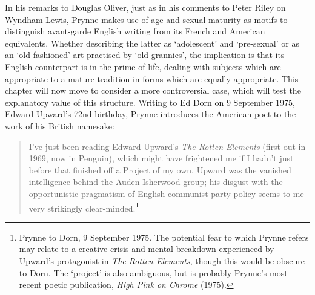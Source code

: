 \documentclass[]{article}
\begin{document}
In his remarks to Douglas Oliver, just as in his comments to Peter Riley
on Wyndham Lewis, Prynne makes use of age and sexual maturity as motifs
to distinguish avant-garde English writing from its French and American
equivalents. Whether describing the latter as ‘adolescent’ and
‘pre-sexual’ or as an ‘old-fashioned’ art practised by ‘old grannies’,
the implication is that its English counterpart is in the prime of life,
dealing with subjects which are appropriate to a mature tradition in
forms which are equally appropriate. This chapter will now move to
consider a more controversial case, which will test the explanatory
value of this structure. Writing to Ed Dorn on 9 September 1975, Edward
Upward’s 72nd birthday, Prynne introduces the American poet to the work
of his British namesake:

\begin{quote}
\singlespacing I’ve just been reading Edward Upward’s \emph{The Rotten
Elements} (first out in 1969, now in Penguin), which might have
frightened me if I hadn’t just before that finished off a Project of my
own. Upward was the vanished intelligence behind the Auden-Isherwood
group; his disgust with the opportunistic pragmatism of English
communist party policy seems to me very strikingly
clear-minded.\footnote{Prynne to Dorn, 9 September 1975. The potential
  fear to which Prynne refers may relate to a creative crisis and mental
  breakdown experienced by Upward’s protagonist in \emph{The Rotten
  Elements}, though this would be obscure to Dorn. The ‘project’ is also
  ambiguous, but is probably Prynne’s most recent poetic publication,
  \emph{High Pink on Chrome} (1975).}
\end{quote}
\end{document}
